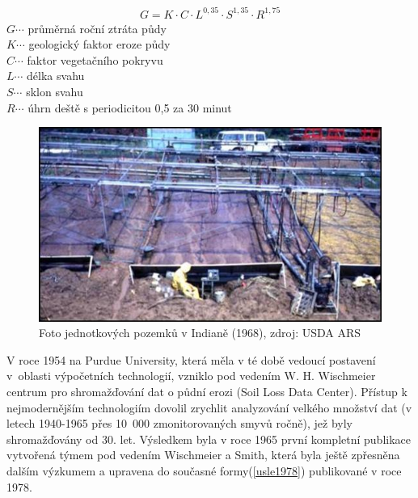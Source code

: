 \begin{align}
   \label{musgrave1947} G=K\cdot C\cdot L^{0,35}\cdot S^{1,35}\cdot R^{1,75}
\end{align}
\hspace*{2cm}$G \cdots$ průměrná roční ztráta půdy\\
\hspace*{2cm}$K \cdots$ geologický faktor eroze půdy \\
\hspace*{2cm}$C \cdots$ faktor vegetačního pokryvu \\
\hspace*{2cm}$L \cdots$ délka svahu \\
\hspace*{2cm}$S \cdots$ sklon svahu \\
\hspace*{2cm}$R \cdots$ úhrn deště s periodicitou 0,5 za 30 minut \\
\begin{figure}[H]
    \centering
    \includegraphics[scale=0.85]{./pictures/unit_plots2.jpg}
      \caption[Foto jednotkových pozemků v Indianě (1968)]{Foto
        jednotkových pozemků v Indianě (1968), zdroj: USDA
        ARS\cite{usda_ars}}
      \label{fig:unit_plots}
\end{figure}
V roce 1954 na Purdue University, která měla v té době vedoucí
postavení v~oblasti výpočetních technologií, vzniklo pod vedením
W. H. Wischmeier centrum pro shromažďování dat o půdní erozi (Soil
Loss Data Center). Přístup k nejmodernějším technologiím dovolil
zrychlit analyzování velkého množství dat (v letech 1940-1965 přes
10~000 zmonitorovaných smyvů ročně), jež byly shromažďovány od
30. let. Výsledkem byla v roce 1965 první kompletní publikace
vytvořená týmem pod vedením Wischmeier a Smith, která byla ještě
zpřesněna dalším výzkumem a upravena do současné formy(\ref{usle1978})
publikované v roce 1978.\cite{usle1978}


